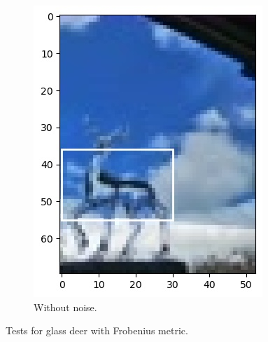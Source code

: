 \documentclass{beamer}
\theoremstyle{definition}
\theoremstyle{remark}
\theoremstyle{example}
\begin{document}
{{\begin{figure}
\begin{subfigure}[b]{0.32\textwidth}
        \centering \includegraphics[width=\textwidth]{figs/1-3-1-test_case3.jpg}
        \caption{Without noise.}
      \end{subfigure}
      \caption{Tests for glass deer with Frobenius metric.}
\end{figure}}
}
\end{document}
